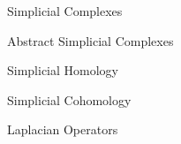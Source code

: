 \documentclass[../main.tex]{subfiles}
\begin{document}
    \begin{section}{Simplicial Complexes} 
            
    \end{section}
    \begin{section}{Abstract Simplicial Complexes} 
            
    \end{section}
    \begin{section}{Simplicial Homology}
            
    \end{section}
    \begin{section}{Simplicial Cohomology}
         
    \end{section}
    \begin{section}{Laplacian Operators}
        \label{sec:1:5}
         
    \end{section}
\end{document}
